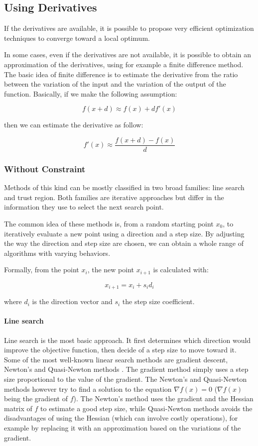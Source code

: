 \subsection{Using Derivatives}

If the derivatives are available, it is possible to propose very efficient optimization techniques to converge toward a local optimum.

In some cases, even if the derivatives are not available, it is possible to obtain an approximation of the derivatives, using for example a finite difference method. The basic idea of finite difference is to estimate the derivative from the ratio between the variation of the input and the variation of the output of the function.
Basically, if we make the following assumption:

$$f(x + d) \approx f(x) +df'(x)$$

then we can estimate the derivative as follow:

$$f'(x) \approx \frac{f(x + d) - f(x)}{d}$$

\subsubsection{Without Constraint}

Methods of this kind can be mostly classified in two broad families: line search and trust region.
Both families are iterative approaches but differ in the information they use to select the next search point.

The common idea of these methods is, from a random starting point $x_0$, to iteratively evaluate a new point using a direction and a step size.
By adjusting the way the direction and step size are chosen, we can obtain a whole range of algorithms with varying behaviors.

Formally, from the point $x_i$, the new point $x_{i+1}$ is calculated with:

$$x_{i+1} = x_i +s_i d_i$$

where $d_i$ is the direction vector and $s_i$ the step size coefficient.

\paragraph{Line search}

Line search is the most basic approach. It first determines which direction would improve the objective function, then decide of a step size to move toward it.
Some of the most well-known linear search methods are gradient descent, Newton's and Quasi-Newton methods \cite{dennis1983numerical}. The gradient method simply uses a step size proportional to the value of the gradient. The Newton's and Quasi-Newton methods however try to find a solution to the equation $\nabla f(x)=0$ ($\nabla f(x)$ being the gradient of $f$). The Newton's method uses the gradient and the Hessian matrix of $f$ to estimate a good step size, while Quasi-Newton methods avoids the disadvantages of using the Hessian (which can involve costly operations), for example by replacing it with an approximation based on the variations of the gradient.

